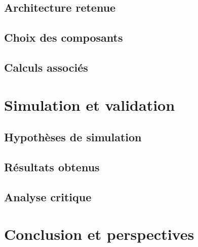 \documentclass[12pt,a4paper]{article}
\begin{document}
\subsection{Architecture retenue}


\subsection{Choix des composants}


\subsection{Calculs associés}












\section{Simulation et validation}


\subsection{Hypothèses de simulation}


\subsection{Résultats obtenus}


\subsection{Analyse critique}












\section{Conclusion et perspectives}


\end{document}
